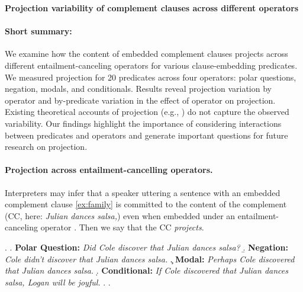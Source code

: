 \documentclass[11pt, a4paper]{article}
\begin{document}

\enablehyphenation

\begin{center}
	\textbf{\large%
		Projection variability of complement clauses across different operators}
\end{center}

\paragraph{Short summary:} %
	We examine how the content of embedded complement clauses projects across different entailment-canceling operators for various clause-embedding predicates.
	We measured projection for 20 predicates across four operators: polar questions, negation, modals, and conditionals. Results reveal projection variation by operator and by-predicate variation in the effect of operator on projection.
	Existing theoretical accounts of projection (e.g., \citealt{heim_projection_1983,van_der_sandt_presupposition_1992,abrusan_predicting_2011,schlenker_triggering_2021}) do not capture the observed variability.
	Our findings highlight the importance of considering interactions between predicates and operators and generate important questions for future research on projection.


\paragraph{Projection across entailment-cancelling operators.}
	Interpreters may infer that a speaker uttering a sentence with an embedded complement clause \ref{ex:family} is committed to the content of the complement (CC, here: \emph{Julian dances salsa,})
	even when embedded under an entailment-canceling operator \Next[a-d]. Then we say that the CC \emph{projects}.

	\ex. \label{ex:family}
		\a. \label{ex:q}
			{\bf Polar Question:} \hfill
			\emph{Did Cole discover that Julian dances salsa?}
		\b. \label{ex:neg}
			{\bf Negation:} \hfill
			\emph{Cole didn't discover that Julian dances salsa.}
		\c. \label{ex:mod}
			{\bf Modal:} \hfill
			\emph{Perhaps Cole discovered that Julian dances salsa.}
		\d. \label{ex:cond}
			{\bf Conditional:} \hfill
			\emph{If Cole discovered that Julian dances salsa, Logan will be joyful.}
		\z.
	\z.
	
\end{document}

